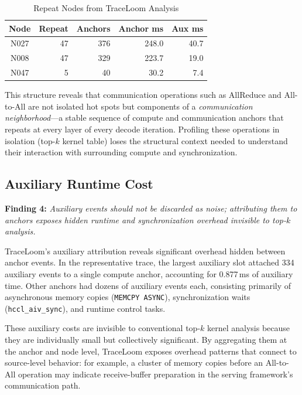 \documentclass[conference]{IEEEtran}
\begin{document}
\begin{table}[htbp]
\caption{Repeat Nodes from TraceLoom Analysis}
\label{tab:repeat-nodes}
\begin{center}
\begin{tabular}{|c|r|r|r|r|}
\hline
\textbf{Node} & \textbf{Repeat} & \textbf{Anchors} & \textbf{Anchor ms} & \textbf{Aux ms} \\
\hline
N027 & 47 & 376 & 248.0 & 40.7 \\
\hline
N008 & 47 & 329 & 223.7 & 19.0 \\
\hline
N047 & 5  & 40  & 30.2  & 7.4  \\
\hline
\end{tabular}
\end{center}
\end{table}

This structure reveals that communication operations such as AllReduce and
All-to-All are not isolated hot spots but components of a \emph{communication
neighborhood}---a stable sequence of compute and communication anchors that
repeats at every layer of every decode iteration. Profiling these operations
in isolation (top-$k$ kernel table) loses the structural context needed to
understand their interaction with surrounding compute and synchronization.

\subsection{Auxiliary Runtime Cost}

\textbf{Finding 4:} \emph{Auxiliary events should not be discarded as noise;
attributing them to anchors exposes hidden runtime and synchronization
overhead invisible to top-$k$ analysis.}

TraceLoom's auxiliary attribution reveals significant overhead hidden between
anchor events. In the representative trace, the largest auxiliary slot attached
334 auxiliary events to a single compute anchor, accounting for 0.877\,ms of
auxiliary time. Other anchors had dozens of auxiliary events each, consisting
primarily of asynchronous memory copies (\texttt{MEMCPY ASYNC}),
synchronization waits (\texttt{hccl\_aiv\_sync}), and runtime control tasks.

These auxiliary costs are invisible to conventional top-$k$ kernel analysis
because they are individually small but collectively significant. By
aggregating them at the anchor and node level, TraceLoom exposes overhead
patterns that connect to source-level behavior: for example, a cluster of
memory copies before an All-to-All operation may indicate receive-buffer
preparation in the serving framework's communication path.
\end{document}

